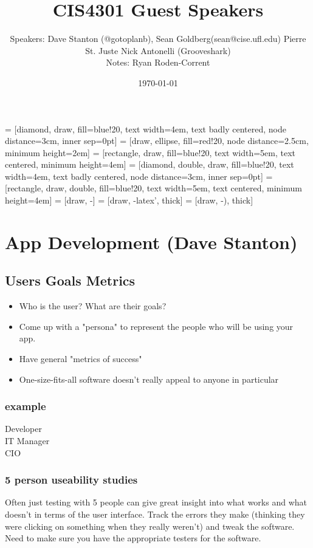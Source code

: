 \documentclass[12pt]{article}
\title{CIS4301 Guest Speakers}
\author{
  Speakers: Dave Stanton (@gotoplanb),
  Sean Goldberg(sean@cise.ufl.edu)
  Pierre St. Juste
  Nick Antonelli (Grooveshark)\\
  Notes: Ryan Roden-Corrent
}
\date{\today}
\begin{document}
\setlength\parindent{0pt}
 = [diamond, draw, fill=blue!20, text width=4em,
  text badly centered, node distance=3cm, inner sep=0pt]
 = [draw, ellipse, fill=red!20, node distance=2.5cm,
  minimum height=2em]
 = [rectangle, draw, fill=blue!20, text width=5em,
  text centered, minimum height=4em]
 = [diamond, double, draw, fill=blue!20, text width=4em,
  text badly centered, node distance=3cm, inner sep=0pt]
 = [rectangle, draw, double, fill=blue!20, text width=5em,
  text centered, minimum height=4em]
 = [draw, -]
 = [draw, -latex', thick]
 = [draw, -), thick]
\maketitle

\section{App Development (Dave Stanton)}
\subsection{Users Goals Metrics}
\begin{itemize}
  \item Who is the user? What are their goals?
  \item Come up with a "persona" to represent the people who will
    be using your app.
  \item Have general "metrics of success"
  \item One-size-fits-all software doesn't really appeal to anyone in particular
\end{itemize}

\subsubsection{example}
\begin{description}
  \item[Developer]
  \item[IT Manager]
  \item[CIO]
\end{description}

\subsubsection{5 person useability studies}
Often just testing with 5 people can give great insight into what works and
what doesn't in terms of the user interface. Track the errors they make
(thinking they were clicking on something when they really weren't) and tweak
the software. Need to make sure you have the appropriate testers for the
software.
\end{document}
